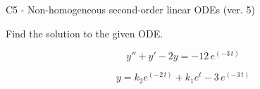 \begin{exercise}
  \begin{exerciseTitle}C5 - Non-homogeneous second-order linear ODEs (ver. 5)\end{exerciseTitle}
  \begin{exerciseStatement}
    
Find the solution to the given ODE.

    
\[y''+y'-2y = -12 \, e^{\left(-3 \, t\right)}\]

  \end{exerciseStatement}
  \begin{exerciseAnswer}
    
\[y= k_{2} e^{\left(-2 \, t\right)} + k_{1} e^{t} - 3 \, e^{\left(-3 \, t\right)}\]

  \end{exerciseAnswer}
\end{exercise}